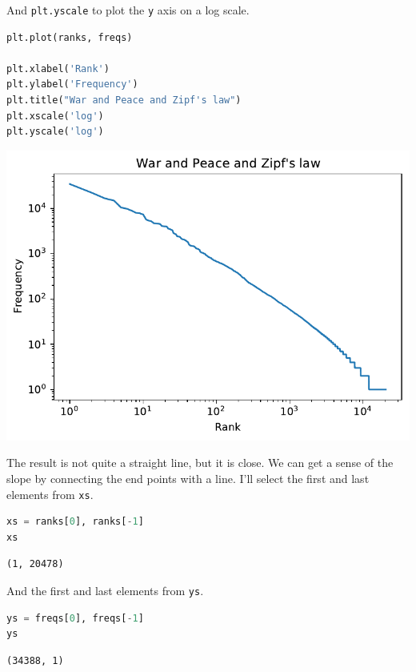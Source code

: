And \passthrough{\lstinline!plt.yscale!} to plot the
\passthrough{\lstinline!y!} axis on a log scale.

\begin{lstlisting}[language=Python]
plt.plot(ranks, freqs)

plt.xlabel('Rank')
plt.ylabel('Frequency')
plt.title("War and Peace and Zipf's law")
plt.xscale('log')
plt.yscale('log')
\end{lstlisting}

\begin{center}
\includegraphics[scale=0.75]{chapters/06_plotting_files/06_plotting_79_0.pdf}
\end{center}

The result is not quite a straight line, but it is close. We can get a
sense of the slope by connecting the end points with a line. I'll select
the first and last elements from \passthrough{\lstinline!xs!}.

\begin{lstlisting}[language=Python]
xs = ranks[0], ranks[-1]
xs
\end{lstlisting}

\begin{lstlisting}[]
(1, 20478)
\end{lstlisting}

And the first and last elements from \passthrough{\lstinline!ys!}.

\begin{lstlisting}[language=Python]
ys = freqs[0], freqs[-1]
ys
\end{lstlisting}

\begin{lstlisting}[]
(34388, 1)
\end{lstlisting}


